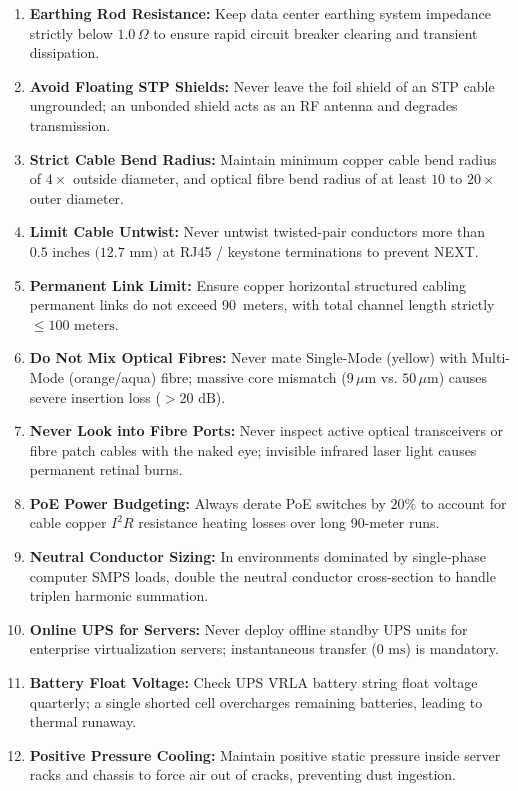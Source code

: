 \begin{enumerate}[leftmargin=*]
    \item \textbf{Earthing Rod Resistance:} Keep data center earthing system impedance strictly below $1.0\,\Omega$ to ensure rapid circuit breaker clearing and transient dissipation.
    \item \textbf{Avoid Floating STP Shields:} Never leave the foil shield of an STP cable ungrounded; an unbonded shield acts as an RF antenna and degrades transmission.
    \item \textbf{Strict Cable Bend Radius:} Maintain minimum copper cable bend radius of $4\times$ outside diameter, and optical fibre bend radius of at least $10\text{ to }20\times$ outer diameter.
    \item \textbf{Limit Cable Untwist:} Never untwist twisted-pair conductors more than $0.5\text{ inches (12.7 mm)}$ at RJ45 / keystone terminations to prevent NEXT.
    \item \textbf{Permanent Link Limit:} Ensure copper horizontal structured cabling permanent links do not exceed 90~meters, with total channel length strictly $\le 100\text{ meters}$.
    \item \textbf{Do Not Mix Optical Fibres:} Never mate Single-Mode (yellow) with Multi-Mode (orange/aqua) fibre; massive core mismatch ($9\,\mu\text{m}$ vs. $50\,\mu\text{m}$) causes severe insertion loss ($>20\text{ dB}$).
    \item \textbf{Never Look into Fibre Ports:} Never inspect active optical transceivers or fibre patch cables with the naked eye; invisible infrared laser light causes permanent retinal burns.
    \item \textbf{PoE Power Budgeting:} Always derate PoE switches by $20\%$ to account for cable copper $I^2 R$ resistance heating losses over long 90-meter runs.
    \item \textbf{Neutral Conductor Sizing:} In environments dominated by single-phase computer SMPS loads, double the neutral conductor cross-section to handle triplen harmonic summation.
    \item \textbf{Online UPS for Servers:} Never deploy offline standby UPS units for enterprise virtualization servers; instantaneous transfer ($0\text{ ms}$) is mandatory.
    \item \textbf{Battery Float Voltage:} Check UPS VRLA battery string float voltage quarterly; a single shorted cell overcharges remaining batteries, leading to thermal runaway.
    \item \textbf{Positive Pressure Cooling:} Maintain positive static pressure inside server racks and chassis to force air out of cracks, preventing dust ingestion.

\end{enumerate}
